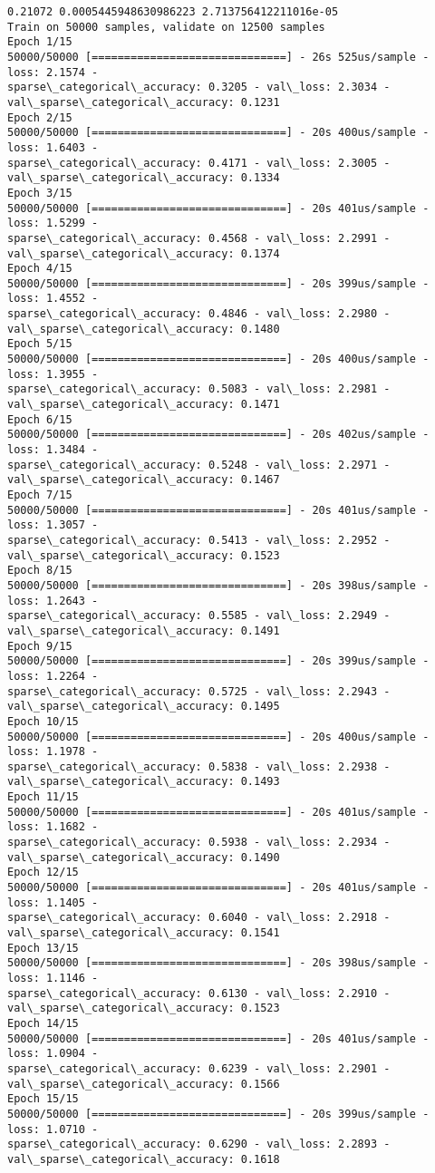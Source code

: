 \documentclass[11pt]{article}
\begin{document}
    \begin{Verbatim}[commandchars=\\\{\}]
0.21072 0.0005445948630986223 2.713756412211016e-05
Train on 50000 samples, validate on 12500 samples
Epoch 1/15
50000/50000 [==============================] - 26s 525us/sample - loss: 2.1574 -
sparse\_categorical\_accuracy: 0.3205 - val\_loss: 2.3034 -
val\_sparse\_categorical\_accuracy: 0.1231
Epoch 2/15
50000/50000 [==============================] - 20s 400us/sample - loss: 1.6403 -
sparse\_categorical\_accuracy: 0.4171 - val\_loss: 2.3005 -
val\_sparse\_categorical\_accuracy: 0.1334
Epoch 3/15
50000/50000 [==============================] - 20s 401us/sample - loss: 1.5299 -
sparse\_categorical\_accuracy: 0.4568 - val\_loss: 2.2991 -
val\_sparse\_categorical\_accuracy: 0.1374
Epoch 4/15
50000/50000 [==============================] - 20s 399us/sample - loss: 1.4552 -
sparse\_categorical\_accuracy: 0.4846 - val\_loss: 2.2980 -
val\_sparse\_categorical\_accuracy: 0.1480
Epoch 5/15
50000/50000 [==============================] - 20s 400us/sample - loss: 1.3955 -
sparse\_categorical\_accuracy: 0.5083 - val\_loss: 2.2981 -
val\_sparse\_categorical\_accuracy: 0.1471
Epoch 6/15
50000/50000 [==============================] - 20s 402us/sample - loss: 1.3484 -
sparse\_categorical\_accuracy: 0.5248 - val\_loss: 2.2971 -
val\_sparse\_categorical\_accuracy: 0.1467
Epoch 7/15
50000/50000 [==============================] - 20s 401us/sample - loss: 1.3057 -
sparse\_categorical\_accuracy: 0.5413 - val\_loss: 2.2952 -
val\_sparse\_categorical\_accuracy: 0.1523
Epoch 8/15
50000/50000 [==============================] - 20s 398us/sample - loss: 1.2643 -
sparse\_categorical\_accuracy: 0.5585 - val\_loss: 2.2949 -
val\_sparse\_categorical\_accuracy: 0.1491
Epoch 9/15
50000/50000 [==============================] - 20s 399us/sample - loss: 1.2264 -
sparse\_categorical\_accuracy: 0.5725 - val\_loss: 2.2943 -
val\_sparse\_categorical\_accuracy: 0.1495
Epoch 10/15
50000/50000 [==============================] - 20s 400us/sample - loss: 1.1978 -
sparse\_categorical\_accuracy: 0.5838 - val\_loss: 2.2938 -
val\_sparse\_categorical\_accuracy: 0.1493
Epoch 11/15
50000/50000 [==============================] - 20s 401us/sample - loss: 1.1682 -
sparse\_categorical\_accuracy: 0.5938 - val\_loss: 2.2934 -
val\_sparse\_categorical\_accuracy: 0.1490
Epoch 12/15
50000/50000 [==============================] - 20s 401us/sample - loss: 1.1405 -
sparse\_categorical\_accuracy: 0.6040 - val\_loss: 2.2918 -
val\_sparse\_categorical\_accuracy: 0.1541
Epoch 13/15
50000/50000 [==============================] - 20s 398us/sample - loss: 1.1146 -
sparse\_categorical\_accuracy: 0.6130 - val\_loss: 2.2910 -
val\_sparse\_categorical\_accuracy: 0.1523
Epoch 14/15
50000/50000 [==============================] - 20s 401us/sample - loss: 1.0904 -
sparse\_categorical\_accuracy: 0.6239 - val\_loss: 2.2901 -
val\_sparse\_categorical\_accuracy: 0.1566
Epoch 15/15
50000/50000 [==============================] - 20s 399us/sample - loss: 1.0710 -
sparse\_categorical\_accuracy: 0.6290 - val\_loss: 2.2893 -
val\_sparse\_categorical\_accuracy: 0.1618
    \end{Verbatim}
\end{document}
